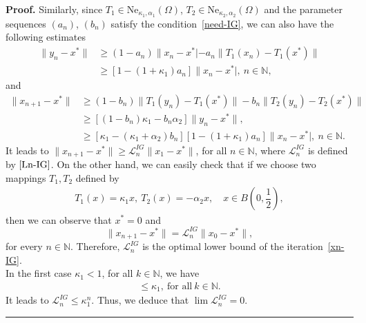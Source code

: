 \documentclass[10pt,a4paper]{amsart}
\newenvironment{proof}[1][Proof]{\textbf{#1.} }{\hfill\rule{0.5em}{0.5em}}
\begin{document}
		\begin{proof}
			Similarly, since $T_1 \in \text{Ne}_{\kappa_1, \alpha_1}(\Omega)$, $T_2 \in \text{Ne}_{\kappa_2, \alpha_2}(\Omega)$ and the parameter sequences $(a_n)$, $(b_n)$ satisfy the condition~\eqref{need-IG}, we can also have the following estimates
			\begin{align*}
				\| y_n - x^* \| &\ge (1 - a_n)\|x_n - x^*| - a_n\|T_1(x_n) - T_1(x^*)\| \\
				&\ge [1 - (1 + \kappa_1)a_n]\|x_n - x^*|, ~ n \in \mathbb{N},
			\end{align*}
			and
			\begin{align*} 
				\|x_{n+1}-x^*\| &\ge (1 - b_n)\|T_1(y_n) - T_1(x^*)\| - b_n\|T_2(y_n) - T_2(x^*)\| \\ &\ge [(1 - b_n)\kappa_1-b_n\alpha_2]\|y_n-x^*\|, \\
				&\ge [\kappa_1 - (\kappa_1 + \alpha_2)b_n][1 - (1 + \kappa_1)a_n]\|x_n - x^*|, ~ n \in \mathbb{N}.
			\end{align*}
			It leads to $\|x_{n+1}-x^*\| \ge \mathcal{L}_n^{IG}\|x_1-x^*\|$, for all $n \in \mathbb{N}$,
			where $\mathcal{L}_n^{IG}$ is defined by $\eqref{Ln-IG}$. 	On the other hand, we can easily check that if we choose two mappings $T_1,T_2$ defined by
			\begin{align*}
				T_1(x)= \kappa_1 x, \ T_2(x)=-\alpha_2 x, \quad x \in B\left(0, \dfrac{1}{2}\right),
			\end{align*}
			then we can observe that $x^*=0$ and 
			$$\|x_{n+1}-x^*\|=\mathcal{L}_n^{IG}\|x_0-x^*\|,$$
			for every $n \in \mathbb{N}$. Therefore, $\mathcal{L}_n^{IG}$ is the optimal lower bound of the iteration~\eqref{xn-IG}. \\
			
			In the first case $\kappa_1<1$, for all $k \in \mathbb{N}$, we have
			\begin{align*}
				[\kappa_1 - (\kappa_1 + \alpha_2)b_k][1 - (1 + \kappa_1)a_k] \le \kappa_1,~ \text{for all} ~k \in \mathbb{N}.
			\end{align*}
			It leads to $\mathcal{L}_n^{IG}\le \kappa_1^n$. Thus, we deduce that $\lim{\mathcal{L}_n^{IG}}=0$. \\
			

\end{proof}
\end{document}
